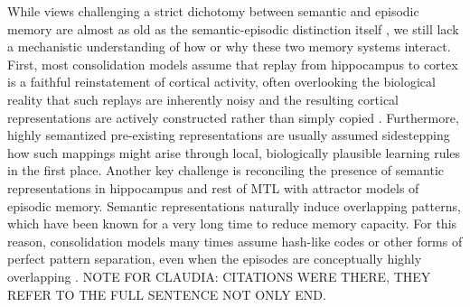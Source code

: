 \documentclass{article}
\begin{document}
\newline\newline
While views challenging a strict dichotomy between semantic and episodic memory are almost as old as the semantic-episodic distinction itself , we still lack a mechanistic understanding of how or why these two memory systems interact. First, most consolidation models assume that replay from hippocampus to cortex is a faithful reinstatement of cortical activity, often overlooking the biological reality that such replays are inherently noisy and the resulting cortical representations are actively constructed rather than simply copied . Furthermore, highly semantized pre-existing representations are usually assumed  sidestepping how such mappings might arise through local, biologically plausible learning rules in the first place. Another key challenge is reconciling the presence of semantic representations in hippocampus and rest of MTL with attractor models of episodic memory. Semantic representations naturally induce overlapping patterns, which have been known for a very long time to reduce memory capacity. For this reason, consolidation models many times assume hash-like codes or other forms of perfect pattern separation, even when the episodes are conceptually highly overlapping . NOTE FOR CLAUDIA: CITATIONS WERE THERE, THEY REFER TO THE FULL SENTENCE NOT ONLY END.
\newline\newline
\end{document}
